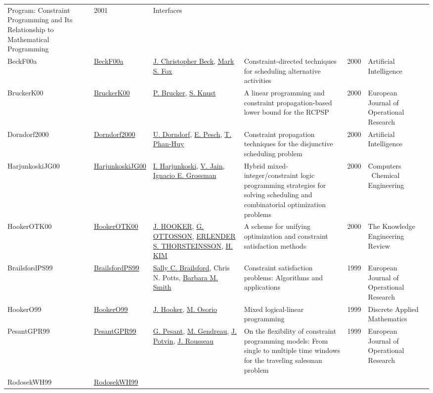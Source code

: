 {\begin{longtable}{p{2cm}p{2cm}p{5cm}p{10cm}rp{3cm}l}
Program: Constraint Programming and Its Relationship to Mathematical Programming & 2001 & Interfaces & \cite{LustigP01}\\BeckF00a & \href{http://dx.doi.org/10.1016/s0004-3702(00)00035-7}{BeckF00a} & \hyperref[auth:a89]{J. Christopher Beck}, \hyperref[auth:a304]{Mark S. Fox} & Constraint-directed techniques for scheduling alternative activities & 2000 & Artificial Intelligence & \cite{BeckF00a}\\BruckerK00 & \href{http://dx.doi.org/10.1016/s0377-2217(99)00489-0}{BruckerK00} & \hyperref[auth:a856]{P. Brucker}, \hyperref[auth:a1190]{S. Knust} & A linear programming and constraint propagation-based lower bound for the RCPSP & 2000 & European Journal of Operational Research & \cite{BruckerK00}\\Dorndorf2000 & \href{http://dx.doi.org/10.1016/s0004-3702(00)00040-0}{Dorndorf2000} & \hyperref[auth:a913]{U. Dorndorf}, \hyperref[auth:a443]{E. Pesch}, \hyperref[auth:a1064]{T. Phan-Huy} & Constraint propagation techniques for the disjunctive scheduling problem & 2000 & Artificial Intelligence & \cite{Dorndorf2000}\\HarjunkoskiJG00 & \href{http://dx.doi.org/10.1016/s0098-1354(00)00470-1}{HarjunkoskiJG00} & \hyperref[auth:a880]{I. Harjunkoski}, \hyperref[auth:a853]{V. Jain}, \hyperref[auth:a1181]{Ignacio E. Grossman} & Hybrid mixed-integer/constraint logic programming strategies for solving scheduling and combinatorial optimization problems & 2000 & Computers \  Chemical Engineering & \cite{HarjunkoskiJG00}\\HookerOTK00 & \href{http://dx.doi.org/10.1017/s0269888900001077}{HookerOTK00} & \hyperref[auth:a1212]{J. HOOKER}, \hyperref[auth:a1213]{G. OTTOSSON}, \hyperref[auth:a1214]{ERLENDER S. THORSTEINSSON}, \hyperref[auth:a1215]{H. KIM} & A scheme for unifying optimization and constraint satisfaction methods & 2000 & The Knowledge Engineering Review & \cite{HookerOTK00}\\BrailsfordPS99 & \href{http://dx.doi.org/10.1016/s0377-2217(98)00364-6}{BrailsfordPS99} & \hyperref[auth:a1069]{Sally C. Brailsford}, Chris N. Potts, \hyperref[auth:a1071]{Barbara M. Smith} & Constraint satisfaction problems: Algorithms and applications & 1999 & European Journal of Operational Research & \cite{BrailsfordPS99}\\HookerO99 & \href{http://dx.doi.org/10.1016/s0166-218x(99)00100-6}{HookerO99} & \hyperref[auth:a1172]{J. Hooker}, \hyperref[auth:a1173]{M. Osorio} & Mixed logical-linear programming & 1999 & Discrete Applied Mathematics & \cite{HookerO99}\\PesantGPR99 & \href{http://dx.doi.org/10.1016/s0377-2217(98)00248-3}{PesantGPR99} & \hyperref[auth:a8]{G. Pesant}, \hyperref[auth:a624]{M. Gendreau}, \hyperref[auth:a1228]{J. Potvin}, \hyperref[auth:a1229]{J. Rousseau} & On the flexibility of constraint programming models: From single to multiple time windows for the traveling salesman problem & 1999 & European Journal of Operational Research & \cite{PesantGPR99}\\RodosekWH99 & \href{http://dx.doi.org/10.1023/a:1018904229454}{RodosekWH99} & \hyperref[auth:a299]{R. 
\end{longtable}}
